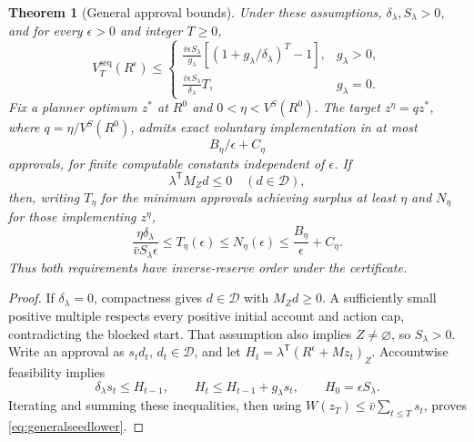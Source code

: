 \documentclass[ecta,draft,supplement]{econsocart}
\newtheorem{theorem}{Theorem}
\theoremstyle{definition}
\theoremstyle{definition}
\begin{document}
\begin{appendix}
\begin{theorem}[General approval bounds]
\label{thm:generalseedbounds}
Under these assumptions, $\delta_\lambda,S_\lambda>0$, and
for every $\epsilon>0$ and integer $T\geq0$,
\begin{equation}
 V_T^{\mathrm{seq}}(R^\epsilon)\leq
 \begin{cases}
 \displaystyle\frac{\bar v\epsilon S_\lambda}{g_\lambda}
       [(1+g_\lambda/\delta_\lambda)^T-1],&g_\lambda>0,\\[5pt]
 \displaystyle\frac{\bar v\epsilon S_\lambda}{\delta_\lambda}T,
       &g_\lambda=0.
 \end{cases}
 \label{eq:generalseedlower}
\end{equation}
Fix a planner optimum $z^*$ at $R^0$ and
$0<\eta<V^S(R^0)$. The target
$z^\eta=qz^*$, where $q=\eta/V^S(R^0)$, admits exact voluntary
implementation in at most
\begin{equation}
 B_\eta/\epsilon+C_\eta
 \label{eq:constructiveseedupper}
\end{equation}
approvals, for finite computable constants independent of $\epsilon$.
If
\begin{equation}
 \lambda^{\mathsf T}M_Zd\leq0\quad(d\in\mathcal D),
 \label{eq:nonexpandingcertificate}
\end{equation}
then, writing $T_\eta$ for the minimum approvals achieving surplus
at least $\eta$ and $N_\eta$ for those implementing $z^\eta$,
\begin{equation}
 \frac{\eta\delta_\lambda}{\bar vS_\lambda\epsilon}
 \leq T_\eta(\epsilon)\leq N_\eta(\epsilon)
 \leq\frac{B_\eta}{\epsilon}+C_\eta.
 \label{eq:sharpinverseseed}
\end{equation}
Thus both requirements have inverse-reserve order under the certificate.
\end{theorem}

\begin{proof}
If $\delta_\lambda=0$, compactness gives $d\in\mathcal D$ with
$M_Zd\geq0$. A sufficiently small positive multiple respects every
positive initial account and action cap, contradicting the blocked
start. That assumption also implies $Z\ne\varnothing$, so
$S_\lambda>0$. Write an approval as $s_td_t$, $d_t\in\mathcal D$,
and let $H_t=\lambda^{\mathsf T}(R^\epsilon+Mz_t)_Z$.
Accountwise feasibility implies
\[
 \delta_\lambda s_t\leq H_{t-1},\qquad
 H_t\leq H_{t-1}+g_\lambda s_t,
 \qquad H_0=\epsilon S_\lambda.
\]
Iterating and summing these inequalities, then using
$W(z_T)\leq\bar v\sum_{t\leq T}s_t$, proves
\eqref{eq:generalseedlower}.


\end{proof}
\end{appendix}
\end{document}
